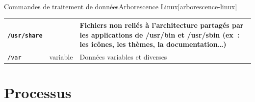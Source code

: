 \documentclass{beamer}
\begin{document}
\begin{frame}{Commandes de traitement de données}{Arborescence Linux\cref{arborescence-linux}}
\begin{tiny}
\begin{table}[h!]
\begin{tabular}{|l|p{3cm}|p{6cm}|}
                    \hline
                    \lstinline{/usr/share} &                         & Fichiers non reliés à l'architecture partagés par les applications de /usr/bin et /usr/sbin (ex~: les icônes, les thèmes, la documentation…)                                         \\
                    \hline
                    \lstinline{/var}       & variable                & Données variables et diverses                                                                                                                                                        \\
                    \hline
                \end{tabular}
            \end{table}
        \end{tiny}
    \end{frame}

    \section{Processus}\label{sec:processus}
\end{document}
